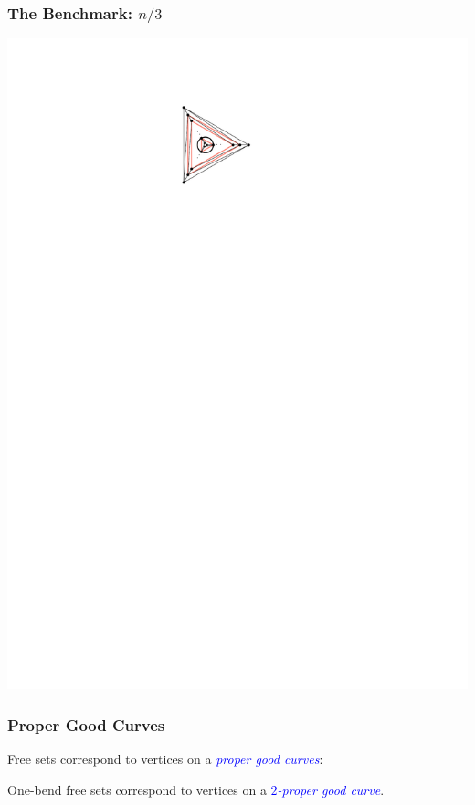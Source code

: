 \documentclass{beamer}
\newcommand{\emphh}[1]{\textcolor{blue}{\emph{#1}}}
\begin{document}
\begin{frame}
  \frametitle{The Benchmark: $n/3$}

  \begin{center}
    \includegraphics[height=.7\textheight]{figs/nover3}
  \end{center}
\end{frame}


\begin{frame}
  \frametitle{Proper Good Curves}

  Free sets correspond to vertices on a \emphh{proper good curves}:

  One-bend free sets correspond to vertices on a \emphh{$2$-proper good curve}.

\end{frame}
\end{document}
